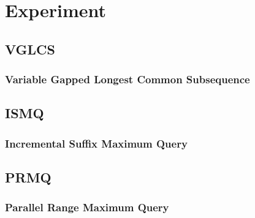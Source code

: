 \section{Experiment}

\subsection{VGLCS}
\begin{frame}
    \frametitle{Variable Gapped Longest Common Subsequence}
\end{frame}

\subsection{ISMQ}
\begin{frame}
    \frametitle{Incremental Suffix Maximum Query}
\end{frame}

\subsection{PRMQ}
\begin{frame}
    \frametitle{Parallel Range Maximum Query}
\end{frame}